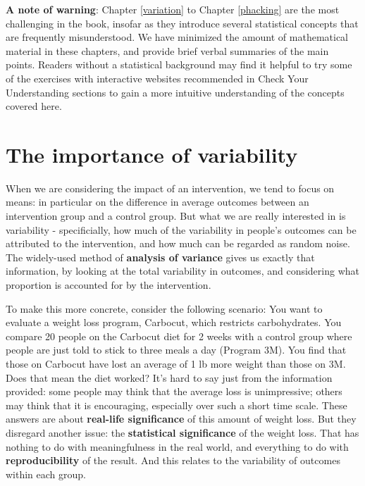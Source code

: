 \documentclass{krantz}
\begin{document}
\textbf{A note of warning}: Chapter \ref{variation} to Chapter \ref{phacking} are the most challenging in the book, insofar as they introduce several statistical concepts that are frequently misunderstood. We have minimized the amount of mathematical material in these chapters, and provide brief verbal summaries of the main points. Readers without a statistical background may find it helpful to try some of the exercises with interactive websites recommended in Check Your Understanding sections to gain a more intuitive understanding of the concepts covered here.

\hypertarget{the-importance-of-variability}{%
\section{The importance of variability}\label{the-importance-of-variability}}

When we are considering the impact of an intervention, we tend to focus on means: in particular on the difference in average outcomes between an intervention group and a control group. But what we are really interested in is variability - specificially, how much of the variability in people's outcomes can be attributed to the intervention, and how much can be regarded as random noise. The widely-used method of \textbf{analysis of variance} gives us exactly that information, by looking at the total variability in outcomes, and considering what proportion is accounted for by the intervention.

To make this more concrete, consider the following scenario: You want to evaluate a weight loss program, Carbocut, which restricts carbohydrates. You compare 20 people on the Carbocut diet for 2 weeks with a control group where people are just told to stick to three meals a day (Program 3M). You find that those on Carbocut have lost an average of 1 lb more weight than those on 3M. Does that mean the diet worked? It's hard to say just from the information provided: some people may think that the average loss is unimpressive; others may think that it is encouraging, especially over such a short time scale. These answers are about \textbf{real-life significance} of this amount of weight loss. But they disregard another issue: the \textbf{statistical significance} of the weight loss. That has nothing to do with meaningfulness in the real world, and everything to do with \textbf{reproducibility} of the result. And this relates to the variability of outcomes within each group.
\end{document}
